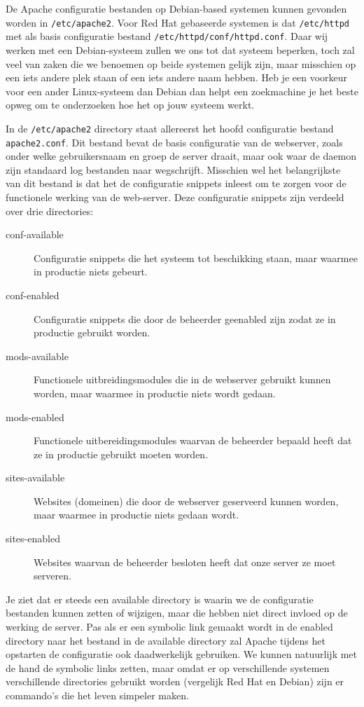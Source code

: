 De Apache configuratie bestanden op Debian-based systemen kunnen gevonden worden in \texttt{/etc/apache2}. Voor Red Hat gebaseerde systemen is dat \texttt{/etc/httpd} met als basis configuratie bestand \texttt{/etc/httpd/conf/httpd.conf}. Daar wij werken met een Debian-systeem zullen we ons tot dat systeem beperken, toch zal veel van zaken die we benoemen op beide systemen gelijk zijn, maar misschien op een iets andere plek staan of een iets andere naam hebben. Heb je een voorkeur voor een ander Linux-systeem dan Debian dan helpt een zoekmachine je het beste opweg om te onderzoeken hoe het op jouw systeem werkt.

In de \texttt{/etc/apache2} directory staat allereerst het hoofd configuratie bestand \texttt{apache2.conf}. Dit bestand bevat de basis configuratie van de webserver, zoals onder welke gebruikersnaam en groep de server draait, maar ook waar de daemon zijn standaard log bestanden naar wegschrijft. Misschien wel het belangrijkste van dit bestand is dat het de configuratie snippets inleest om te zorgen voor de functionele werking van de web-server. Deze configuratie snippets zijn verdeeld over drie directories:
\begin{description}
\item[conf-available] Configuratie snippets die het systeem tot beschikking staan, maar waarmee in productie niets gebeurt.
\item[conf-enabled] Configuratie snippets die door de beheerder geenabled zijn zodat ze in productie gebruikt worden.
\item[mods-available] Functionele uitbreidingsmodules die in de webserver gebruikt kunnen worden, maar waarmee in productie niets wordt gedaan.
\item[mods-enabled] Functionele uitbereidingsmodules waarvan de beheerder bepaald heeft dat ze in productie gebruikt moeten worden.
\item[sites-available] Websites (domeinen) die door de webserver geserveerd kunnen worden, maar waarmee in productie niets gedaan wordt.
\item[sites-enabled] Websites waarvan de beheerder besloten heeft dat onze server ze moet serveren.
\end{description}

Je ziet dat er steeds een available directory is waarin we de configuratie bestanden kunnen zetten of wijzigen, maar die hebben niet direct invloed op de werking de server. Pas als er een symbolic link gemaakt wordt in de enabled directory naar het bestand in de available directory zal Apache tijdens het opstarten de configuratie ook daadwerkelijk gebruiken. We kunnen natuurlijk met de hand de symbolic links zetten, maar omdat er op verschillende systemen verschillende directories gebruikt worden (vergelijk Red Hat en Debian) zijn er commando's die het leven simpeler maken.

